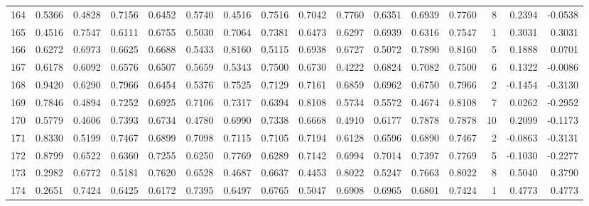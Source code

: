 \begin{tabular}{lrrrrrrrrrrrrrrr}
164 &      0.5366 &  0.4828 &  0.7156 &  0.6452 &  0.5740 &  0.4516 &  0.7516 &  0.7042 &  0.7760 &  0.6351 &   0.6939 &     0.7760 &      8 &                    0.2394 &                    -0.0538 \\
165 &      0.4516 &  0.7547 &  0.6111 &  0.6755 &  0.5030 &  0.7064 &  0.7381 &  0.6473 &  0.6297 &  0.6939 &   0.6316 &     0.7547 &      1 &                    0.3031 &                     0.3031 \\
166 &      0.6272 &  0.6973 &  0.6625 &  0.6688 &  0.5433 &  0.8160 &  0.5115 &  0.6938 &  0.6727 &  0.5072 &   0.7890 &     0.8160 &      5 &                    0.1888 &                     0.0701 \\
167 &      0.6178 &  0.6092 &  0.6576 &  0.6507 &  0.5659 &  0.5343 &  0.7500 &  0.6730 &  0.4222 &  0.6824 &   0.7082 &     0.7500 &      6 &                    0.1322 &                    -0.0086 \\
168 &      0.9420 &  0.6290 &  0.7966 &  0.6454 &  0.5376 &  0.7525 &  0.7129 &  0.7161 &  0.6859 &  0.6962 &   0.6750 &     0.7966 &      2 &                   -0.1454 &                    -0.3130 \\
169 &      0.7846 &  0.4894 &  0.7252 &  0.6925 &  0.7106 &  0.7317 &  0.6394 &  0.8108 &  0.5734 &  0.5572 &   0.4674 &     0.8108 &      7 &                    0.0262 &                    -0.2952 \\
170 &      0.5779 &  0.4606 &  0.7393 &  0.6734 &  0.4780 &  0.6990 &  0.7338 &  0.6668 &  0.4910 &  0.6177 &   0.7878 &     0.7878 &     10 &                    0.2099 &                    -0.1173 \\
171 &      0.8330 &  0.5199 &  0.7467 &  0.6899 &  0.7098 &  0.7115 &  0.7105 &  0.7194 &  0.6128 &  0.6596 &   0.6890 &     0.7467 &      2 &                   -0.0863 &                    -0.3131 \\
172 &      0.8799 &  0.6522 &  0.6360 &  0.7255 &  0.6250 &  0.7769 &  0.6289 &  0.7142 &  0.6994 &  0.7014 &   0.7397 &     0.7769 &      5 &                   -0.1030 &                    -0.2277 \\
173 &      0.2982 &  0.6772 &  0.5181 &  0.7620 &  0.6528 &  0.4687 &  0.6637 &  0.4453 &  0.8022 &  0.5247 &   0.7663 &     0.8022 &      8 &                    0.5040 &                     0.3790 \\
174 &      0.2651 &  0.7424 &  0.6425 &  0.6172 &  0.7395 &  0.6497 &  0.6765 &  0.5047 &  0.6908 &  0.6965 &   0.6801 &     0.7424 &      1 &                    0.4773 &                     0.4773 \\

\end{tabular}
